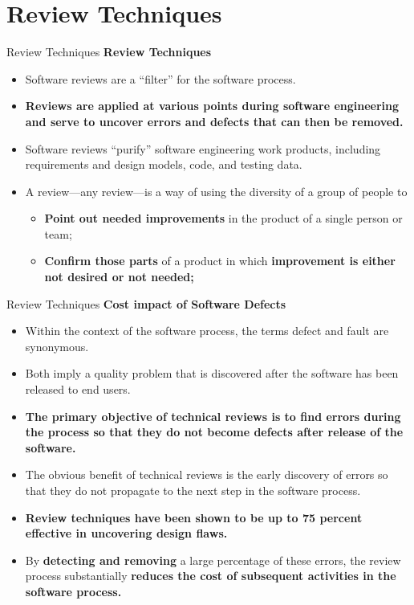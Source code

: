 \documentclass{beamer}
\begin{document}
\section{Review Techniques}
\begin{frame}{Review Techniques}
\textbf{Review Techniques}
\begin{itemize}
	\item Software reviews are a “filter” for the software process.
	\item \textbf{Reviews are applied at various points during software engineering and serve to uncover errors and defects that can then be removed. }
	\item Software reviews “purify” software engineering work products, 
	including requirements and design models, code, and testing data.
	\item A review—any review—is a way of using the diversity of a group of 
	people to
	\begin{itemize}
		\item \textbf{Point out needed improvements} in the product of a single 
		person or team;
		\item \textbf{Confirm those parts} of a product in which \textbf{improvement is 
			either not desired or not needed;}
	\end{itemize}

\end{itemize}
\end{frame}
\begin{frame}{Review Techniques}
	\textbf{Cost impact of Software Defects}
	\begin{itemize}
		\item Within the context of the software process, the terms defect and fault are synonymous.
		\item Both imply a quality problem that is discovered after the software has been released to end users.
		
		\item \textbf{The primary objective of technical reviews is to find errors during the process so that they do not become defects after release of the software. }
		\item The obvious benefit of technical reviews is the early discovery of errors so that they do not
		propagate to the next step in the software process.
		\item \textbf{Review techniques have been shown to be up to 75 percent effective in 
			uncovering design flaws.}
		\item By\textbf{ detecting and removing} a large percentage of these errors, the review process substantially \textbf{reduces the cost of subsequent activities in the software process.}
		
	\end{itemize}
\end{frame}
\end{document}
